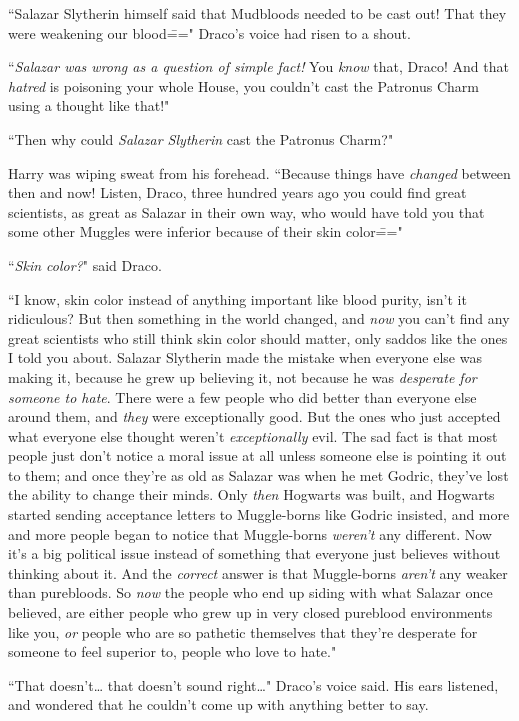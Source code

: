 ``Salazar Slytherin himself said that Mudbloods needed to be cast out! That they were weakening our blood\===" Draco's voice had risen to a shout.

``\emph{Salazar was wrong as a question of simple fact!} You \emph{know} that, Draco! And that \emph{hatred} is poisoning your whole House, you couldn't cast the Patronus Charm using a thought like that!"

``Then why could \emph{Salazar Slytherin} cast the Patronus Charm?"

Harry was wiping sweat from his forehead. ``Because things have \emph{changed} between then and now! Listen, Draco, three hundred years ago you could find great scientists, as great as Salazar in their own way, who would have told you that some other Muggles were inferior because of their skin color\==="

``\emph{Skin color?}" said Draco.

``I know, skin color instead of anything important like blood purity, isn't it ridiculous? But then something in the world changed, and \emph{now} you can't find any great scientists who still think skin color should matter, only saddos like the ones I told you about. Salazar Slytherin made the mistake when everyone else was making it, because he grew up believing it, not because he was \emph{desperate for someone to hate}. There were a few people who did better than everyone else around them, and \emph{they} were exceptionally good. But the ones who just accepted what everyone else thought weren't \emph{exceptionally} evil. The sad fact is that most people just don't notice a moral issue at all unless someone else is pointing it out to them; and once they're as old as Salazar was when he met Godric, they've lost the ability to change their minds. Only \emph{then} Hogwarts was built, and Hogwarts started sending acceptance letters to Muggle-borns like Godric insisted, and more and more people began to notice that Muggle-borns \emph{weren't} any different. Now it's a big political issue instead of something that everyone just believes without thinking about it. And the \emph{correct} answer is that Muggle-borns \emph{aren't} any weaker than purebloods. So \emph{now} the people who end up siding with what Salazar once believed, are either people who grew up in very closed pureblood environments like you, \emph{or} people who are so pathetic themselves that they're desperate for someone to feel superior to, people who love to hate."

``That doesn't{\ldots} that doesn't sound right{\ldots}" Draco's voice said. His ears listened, and wondered that he couldn't come up with anything better to say.

